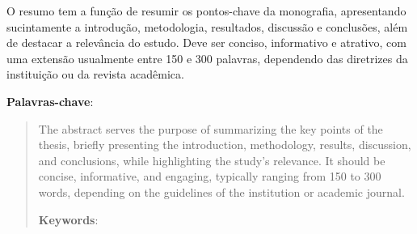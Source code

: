 

{\fontsize{12pt}{12pt}\selectfont %
\renewcommand{\resumoname}{\textbf{\fontsize{12pt}{12pt}\selectfont RESUMO}} %

\begin{resumo}
   \noindent 
    O resumo tem a função de resumir os pontos-chave da monografia, 
    apresentando sucintamente a introdução, metodologia, resultados,  
    discussão e conclusões, além de destacar a relevância do estudo. 
    Deve ser conciso, informativo e atrativo, com uma extensão usualmente 
    entre 150 e 300 palavras, dependendo das diretrizes da instituição 
    ou da revista acadêmica.

    \textbf{Palavras-chave}: 
\end{resumo}
}
\newpage


{\fontsize{12pt}{12pt}\selectfont %
\renewcommand{\abstractname}{\textbf{\fontsize{12pt}{12pt}\selectfont ABSTRACT}} %

\begin{abstract}
    \noindent
The abstract serves the purpose of summarizing the key points of the thesis, briefly presenting the introduction, methodology, results, discussion, and conclusions, while highlighting the study's relevance. It should be concise, informative, and engaging, typically ranging from 150 to 300 words, depending on the guidelines of the institution or academic journal.
    
    \textbf{Keywords}:
\end{abstract}
}
\newpage
